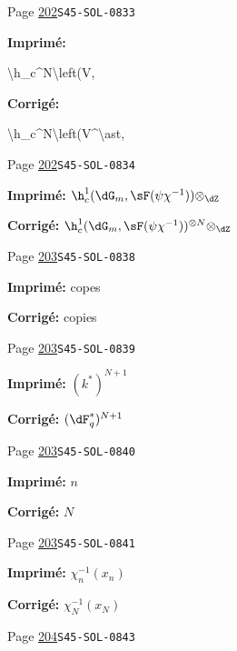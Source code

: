 \begin{description}
\smallskip
\item[\hypertarget{apparatus:FR-0188}{188}] Page \hyperlink{printpage:fr:202}{202}\quad\texttt{S45-SOL-0833}
\par\noindent\textbf{Imprimé:} {\footnotesize\ttfamily\raggedright \textbackslash{}\allowbreak{}h\_\allowbreak{}c\textasciicircum{}\allowbreak{}N\textbackslash{}\allowbreak{}left(\allowbreak{}V,\allowbreak{}\par}
\par\noindent\textbf{Corrigé:} {\footnotesize\ttfamily\raggedright \textbackslash{}\allowbreak{}h\_\allowbreak{}c\textasciicircum{}\allowbreak{}N\textbackslash{}\allowbreak{}left(\allowbreak{}V\textasciicircum{}\allowbreak{}\textbackslash{}\allowbreak{}ast,\allowbreak{}\par}
\smallskip
\item[\hypertarget{apparatus:FR-0189}{189}] Page \hyperlink{printpage:fr:202}{202}\quad\texttt{S45-SOL-0834}
\par\noindent\textbf{Imprimé:} \(\h_c^1(\dG_m,\sF(\psi\chi^{-1})) \otimes_\dZ\)
\par\noindent\textbf{Corrigé:} \(\h_c^1(\dG_m,\sF(\psi\chi^{-1}))^{\otimes N} \otimes_\dZ\)
\smallskip
\item[\hypertarget{apparatus:FR-0190}{190}] Page \hyperlink{printpage:fr:203}{203}\quad\texttt{S45-SOL-0838}
\par\noindent\textbf{Imprimé:} copes
\par\noindent\textbf{Corrigé:} copies
\smallskip
\item[\hypertarget{apparatus:FR-0191}{191}] Page \hyperlink{printpage:fr:203}{203}\quad\texttt{S45-SOL-0839}
\par\noindent\textbf{Imprimé:} \((k^\ast)^{N+1}\)
\par\noindent\textbf{Corrigé:} \((\dF_q^\ast)^{N+1}\)
\smallskip
\item[\hypertarget{apparatus:FR-0192}{192}] Page \hyperlink{printpage:fr:203}{203}\quad\texttt{S45-SOL-0840}
\par\noindent\textbf{Imprimé:} \(n\)
\par\noindent\textbf{Corrigé:} \(N\)
\smallskip
\item[\hypertarget{apparatus:FR-0193}{193}] Page \hyperlink{printpage:fr:203}{203}\quad\texttt{S45-SOL-0841}
\par\noindent\textbf{Imprimé:} \(\chi_n^{-1}(x_n)\)
\par\noindent\textbf{Corrigé:} \(\chi_N^{-1}(x_N)\)
\smallskip
\item[\hypertarget{apparatus:FR-0194}{194}] Page \hyperlink{printpage:fr:204}{204}\quad\texttt{S45-SOL-0843}

\end{description}

